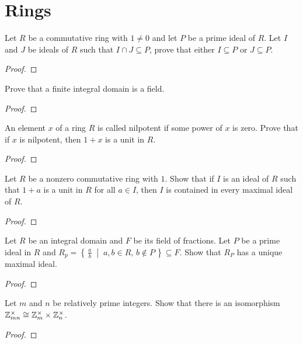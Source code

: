 \section{Rings}
\begin{problem}
Let $R$ be a commutative ring with $1\neq 0$ and let $P$ be a prime ideal
of $R$. Let $I$ and $J$ be ideals of $R$ such that $I\cap J\subseteq P$,
prove that either $I\subseteq P$ or $J\subseteq P$.
\end{problem}
\begin{proof}
\end{proof}
\begin{problem}
Prove that a finite integral domain is a field.
\end{problem}
\begin{proof}
\end{proof}

\begin{problem}
An element $x$ of a ring $R$ is called nilpotent if some power of $x$ is
zero. Prove that if $x$ is nilpotent, then $1+x$ is a unit in $R$.
\end{problem}
\begin{proof}
\end{proof}

\begin{problem}
Let $R$ be a nonzero commutative ring with $1$. Show that if $I$ is an
ideal of $R$ such that $1+a$ is a unit in $R$ for all $a\in I$, then $I$ is
contained in every maximal ideal of $R$.
\end{problem}
\begin{proof}
\end{proof}

\begin{problem}
Let $R$ be an integral domain and $F$ be its field of fractions. Let $P$ be
a prime ideal in $R$ and $R_p=\left\{\,\tfrac{a}{b}\;\middle|\;a,b\in
  R,\,b\notin P\,\right\}\subseteq F$. Show that $R_P$ has a unique maximal
ideal.
\end{problem}
\begin{proof}
\end{proof}

\begin{problem}
Let $m$ and $n$ be relatively prime integers. Show that there is an
isomorphism $\mathbb{Z}_{mn}^\times\cong\mathbb{Z}_m^\times\times\mathbb{Z}_n^\times$.
\end{problem}
\begin{proof}
\end{proof}

